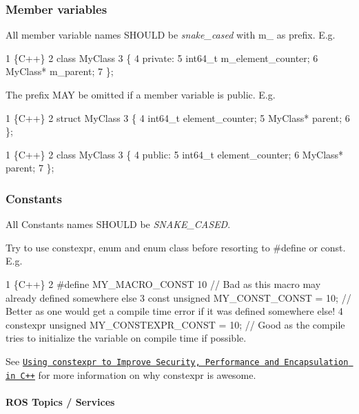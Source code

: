 \subsubsection*{Member variables}

All member variable names S\+H\+O\+U\+LD be {\itshape snake\+\_\+cased} with {\ttfamily m\+\_\+} as prefix. E.\+g. 
\begin{DoxyCode}
1 \{C++\}
2 class MyClass
3 \{
4     private:
5     int64\_t m\_element\_counter;
6     MyClass* m\_parent;
7 \};
\end{DoxyCode}


The prefix M\+AY be omitted if a member variable is {\ttfamily public}. E.\+g. 
\begin{DoxyCode}
1 \{C++\}
2 struct MyClass
3 \{
4     int64\_t element\_counter;
5     MyClass* parent;
6 \};
\end{DoxyCode}
 
\begin{DoxyCode}
1 \{C++\}
2 class MyClass
3 \{
4     public:
5     int64\_t element\_counter;
6     MyClass* parent;
7 \};
\end{DoxyCode}


\subsubsection*{Constants}

All Constants names S\+H\+O\+U\+LD be {\itshape S\+N\+A\+K\+E\+\_\+\+C\+A\+S\+ED}.

Try to use {\ttfamily constexpr}, {\ttfamily enum} and {\ttfamily enum class} before resorting to {\ttfamily \#define} or {\ttfamily const}. E.\+g. 
\begin{DoxyCode}
1 \{C++\}
2 #define MY\_MACRO\_CONST 10                   // Bad as this macro may already defined somewhere else
3 const unsigned MY\_CONST\_CONST = 10;         // Better as one would get a compile time error if it was
       defined somewhere else!
4 constexpr unsigned MY\_CONSTEXPR\_CONST = 10; // Good as the compile tries to initialize the variable on
       compile time if possible.
\end{DoxyCode}


See \href{https://smartbear.de/blog/develop/using-constexpr-to-improve-security-performance-an/?l=ua}{\tt Using constexpr to Improve Security, Performance and Encapsulation in C++} for more information on why {\ttfamily constexpr} is awesome.

\paragraph*{R\+OS Topics / Services}

